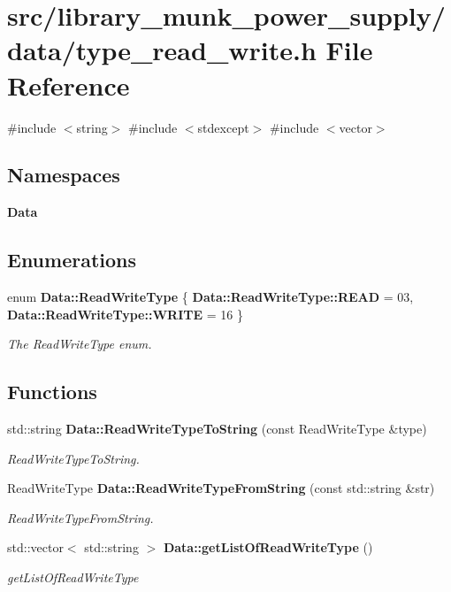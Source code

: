 \section{src/library\+\_\+munk\+\_\+power\+\_\+supply/data/type\+\_\+read\+\_\+write.h File Reference}
\label{type__read__write_8h}
{\ttfamily \#include $<$string$>$}\newline
{\ttfamily \#include $<$stdexcept$>$}\newline
{\ttfamily \#include $<$vector$>$}\newline
\subsection*{Namespaces}
\begin{DoxyCompactItemize}
\item 
 \textbf{ Data}
\end{DoxyCompactItemize}
\subsection*{Enumerations}
\begin{DoxyCompactItemize}
\item 
enum \textbf{ Data\+::\+Read\+Write\+Type} \{ \textbf{ Data\+::\+Read\+Write\+Type\+::\+R\+E\+AD} = 03, 
\textbf{ Data\+::\+Read\+Write\+Type\+::\+W\+R\+I\+TE} = 16
 \}\begin{DoxyCompactList}\small\item\em The Read\+Write\+Type enum. \end{DoxyCompactList}
\end{DoxyCompactItemize}
\subsection*{Functions}
\begin{DoxyCompactItemize}
\item 
std\+::string \textbf{ Data\+::\+Read\+Write\+Type\+To\+String} (const Read\+Write\+Type \&type)
\begin{DoxyCompactList}\small\item\em Read\+Write\+Type\+To\+String. \end{DoxyCompactList}\item 
Read\+Write\+Type \textbf{ Data\+::\+Read\+Write\+Type\+From\+String} (const std\+::string \&str)
\begin{DoxyCompactList}\small\item\em Read\+Write\+Type\+From\+String. \end{DoxyCompactList}\item 
std\+::vector$<$ std\+::string $>$ \textbf{ Data\+::get\+List\+Of\+Read\+Write\+Type} ()
\begin{DoxyCompactList}\small\item\em get\+List\+Of\+Read\+Write\+Type \end{DoxyCompactList}\end{DoxyCompactItemize}
